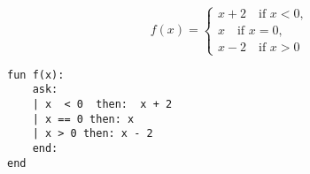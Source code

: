 \documentclass{article}
\begin{document}
\begin{equation}
f(x) = \begin{cases}
x  + 2 \quad  \text{if } x < 0, \\
x \quad \text{if } x = 0, \\
x -2 \quad \text{if } x > 0
\end{cases}
\end{equation}

\begin{lstlisting}
fun f(x):
    ask:
    | x  < 0  then:  x + 2 
    | x == 0 then: x 
    | x > 0 then: x - 2 
    end:
end
\end{lstlisting}
\end{document}
